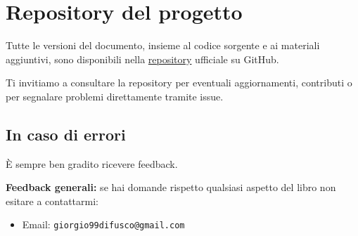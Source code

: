 \section{Repository del progetto}
Tutte le versioni del documento, insieme al codice sorgente e ai materiali aggiuntivi, sono disponibili nella \href{https://github.com/Giordi9902/unina_asd_notes}{repository} ufficiale su GitHub.

Ti invitiamo a consultare la repository per eventuali aggiornamenti, contributi o per segnalare problemi direttamente tramite issue.

\subsection{In caso di errori}
È sempre ben gradito ricevere feedback.

\textbf{Feedback generali:} se hai domande rispetto qualsiasi aspetto del libro non esitare a contattarmi:
\begin{itemize}
	\item Email: \texttt{giorgio99difusco@gmail.com}
\end{itemize}
